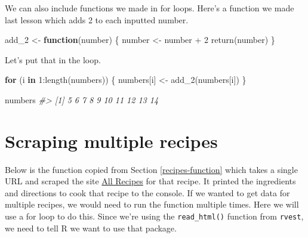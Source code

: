 \documentclass[
  12pt,
  openany]{book}
\newenvironment{Shaded}{\begin{snugshade}}{\end{snugshade}}
\newcommand{\CommentTok}[1]{\textcolor[rgb]{0.37,0.37,0.37}{\textit{#1}}}
\newcommand{\ControlFlowTok}[1]{\textcolor[rgb]{0.27,0.27,0.27}{\textbf{#1}}}
\newcommand{\DecValTok}[1]{\textcolor[rgb]{0.06,0.06,0.06}{#1}}
\newcommand{\FunctionTok}[1]{\textcolor[rgb]{0,0,0}{#1}}
\newcommand{\NormalTok}[1]{#1}
\newcommand{\OtherTok}[1]{\textcolor[rgb]{0.37,0.37,0.37}{#1}}
\newcommand{\SpecialCharTok}[1]{\textcolor[rgb]{0,0,0}{#1}}
\begin{document}
We can also include functions we made in for loops. Here's a function we made last lesson which adds 2 to each inputted number.

\begin{Shaded}
\begin{Highlighting}[]
\NormalTok{add\_2 }\OtherTok{\textless{}{-}} \ControlFlowTok{function}\NormalTok{(number) \{}
\NormalTok{  number }\OtherTok{\textless{}{-}}\NormalTok{ number }\SpecialCharTok{+} \DecValTok{2}
  \FunctionTok{return}\NormalTok{(number)}
\NormalTok{\}}
\end{Highlighting}
\end{Shaded}

Let's put that in the loop.

\begin{Shaded}
\begin{Highlighting}[]
\ControlFlowTok{for}\NormalTok{ (i }\ControlFlowTok{in} \DecValTok{1}\SpecialCharTok{:}\FunctionTok{length}\NormalTok{(numbers)) \{}
\NormalTok{  numbers[i] }\OtherTok{\textless{}{-}} \FunctionTok{add\_2}\NormalTok{(numbers[i])}
\NormalTok{\}}
\end{Highlighting}
\end{Shaded}

\begin{Shaded}
\begin{Highlighting}[]
\NormalTok{numbers}
\CommentTok{\#\textgreater{}  [1]  5  6  7  8  9 10 11 12 13 14}
\end{Highlighting}
\end{Shaded}

\hypertarget{scraping-multiple-recipes}{%
\section{Scraping multiple recipes}\label{scraping-multiple-recipes}}

Below is the function copied from Section \ref{recipes-function} which takes a single URL and scraped the site \href{https://www.allrecipes.com/}{All Recipes} for that recipe. It printed the ingredients and directions to cook that recipe to the console. If we wanted to get data for multiple recipes, we would need to run the function multiple times. Here we will use a for loop to do this. Since we're using the \texttt{read\_html()} function from \texttt{rvest}, we need to tell R we want to use that package.
\end{document}
